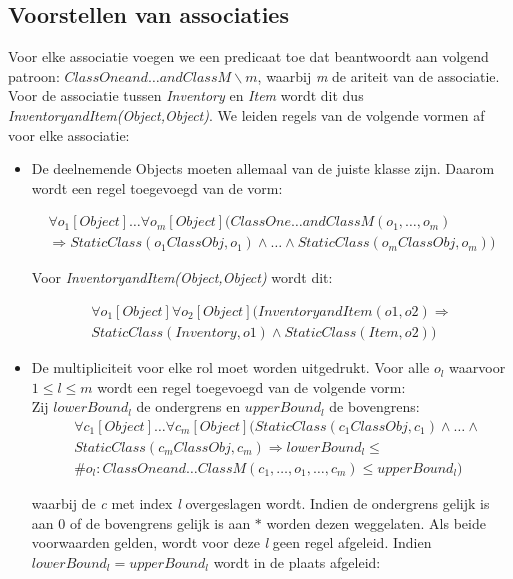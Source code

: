 \subsection{Voorstellen van associaties}
Voor elke associatie voegen we een predicaat toe dat beantwoordt aan volgend patroon: \textit{$ClassOneand\ldots{}andClassM\backslash{m}$}, waarbij \textit{m} de ariteit van de associatie. Voor de associatie tussen \textit{Inventory} en \textit{Item} wordt dit dus \textit{InventoryandItem(Object,Object)}. We leiden regels van de volgende vormen af voor elke associatie:

\begin{itemize}
	\item De deelnemende Objects moeten allemaal van de juiste klasse zijn. Daarom wordt een regel toegevoegd van de vorm:
	
	\begin{align*}
	\forall{o_1}[Object]\ldots\forall{o_m}[Object](ClassOne\ldots{}andClassM(o_1,\ldots,o_m) \\ \Rightarrow StaticClass(o_{1}ClassObj,o_1) \land \ldots \land StaticClass(o_{m}ClassObj,o_m))
	\end{align*}
	
	Voor \textit{InventoryandItem(Object,Object)} wordt dit:
	
	\begin{align*}
	\forall{o_1}[Object]\forall{o_2}[Object](InventoryandItem(o1,o2) \Rightarrow \\ StaticClass(Inventory,o1) \land StaticClass(Item,o2))
	\end{align*}
	
	\item De multipliciteit voor elke rol moet worden uitgedrukt. Voor alle $o_l$ waarvoor $1 \leq l \leq m$ wordt een regel toegevoegd van de volgende vorm:\\
	Zij $lowerBound_l$ de ondergrens en $upperBound_l$ de bovengrens:
	\begin{align*}
	&\forall{c_1}[Object]\ldots\forall{c_m}[Object](StaticClass(c_{1}ClassObj,c_1) \land \ldots \land
	\\
	&StaticClass(c_{m}ClassObj,c_m) \Rightarrow lowerBound_l \leq
	\\
	&\#{o_l: ClassOneand\ldots{}ClassM(c_1,\ldots,o_1,\ldots,c_m)} \leq upperBound_l)
	\end{align*}
	
	waarbij de \textit{c} met index \textit{l} overgeslagen wordt. Indien de ondergrens gelijk is aan $0$ of de bovengrens gelijk is aan $*$ worden dezen weggelaten. Als beide voorwaarden gelden, wordt voor deze \textit{l} geen regel afgeleid. Indien $lowerBound_l = upperBound_l$ wordt in de plaats afgeleid:
	

\end{itemize}
